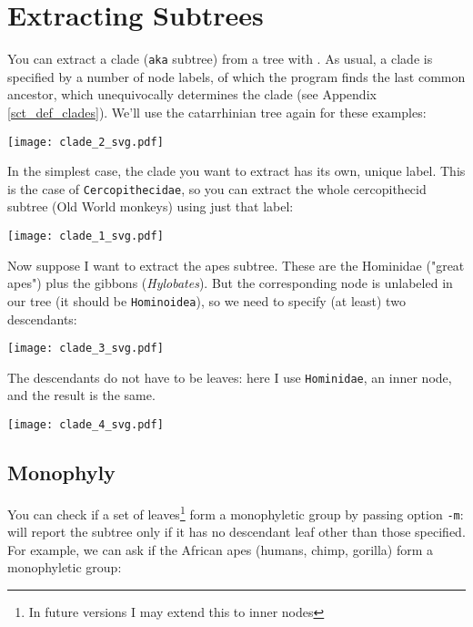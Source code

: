

\section{Extracting Subtrees}
\label{sct_subtrees}

You can extract a clade (\texttt{aka} subtree) from a tree with \clade. As
usual, a clade is specified by a number of node labels, of which the program
finds the last common ancestor, which unequivocally determines the clade (see
Appendix \ref{sct_def_clades}).  We'll use the catarrhinian tree again for
these examples:


\begin{center}
\texttt{[image: clade\_2\_svg.pdf]}
\end{center}

In the simplest case, the clade you want to extract has its own, unique label.
This is the case of \texttt{Cercopithecidae}, so you can extract the whole
cercopithecid subtree (Old World monkeys) using just that label:


\begin{center}
  \texttt{[image: clade\_1\_svg.pdf]}
\end{center}

Now suppose I want to extract the apes subtree. These are the Hominidae
("great apes") plus the gibbons (\textit{Hylobates}). But the corresponding
node is unlabeled in our tree (it should be \texttt{Hominoidea}), so we need to specify (at least) two descendants:


\begin{center}
  \texttt{[image: clade\_3\_svg.pdf]}
\end{center}

\noindent{}The descendants do not have to be leaves: here I use \texttt{Hominidae}, an inner node, and the result is the same.


\begin{center}
  \texttt{[image: clade\_4\_svg.pdf]}
\end{center}

\subsection{Monophyly}

You can check if a set of leaves\footnote{In future versions I
may extend this to inner nodes} form a monophyletic group by passing option
\texttt{-m}: \clade{} will report the subtree only if it has no descendant leaf other than those specified.  For example, we can ask if the African apes (humans, chimp, gorilla) form a monophyletic group:

